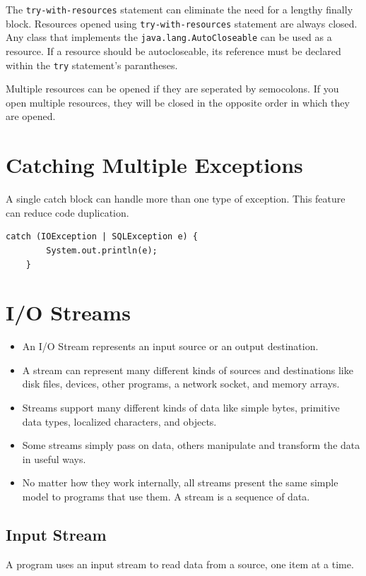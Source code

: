 \documentclass[11pt,a4paper]{article}
\begin{document}
The \texttt{try-with-resources} statement can eliminate the need for a lengthy finally block. Resources opened using \texttt{try-with-resources} statement are always closed. Any class that implements the \texttt{java.lang.AutoCloseable} can be used as a resource. If a resource should be autocloseable, its reference must be declared within the \texttt{try} statement's parantheses.

Multiple resources can be opened if they are seperated by semocolons. If you open multiple resources, they will be closed in the opposite order in which they are opened.

\section*{Catching Multiple Exceptions}
A single catch block can handle more than one type of exception. This feature can reduce code duplication.

\begin{lstlisting}[numbers=none]
    catch (IOException | SQLException e) {
        System.out.println(e);
    }
\end{lstlisting}
 
\section*{I/O Streams}
\begin{itemize}
\item An I/O Stream represents an input source or an output destination. 
\item A stream can represent many different kinds of sources and destinations like disk files, devices, other programs, a network socket, and memory arrays. 
\item Streams support many different kinds of data like simple bytes, primitive data types, localized characters, and objects. 
\item Some streams simply pass on data, others manipulate and transform the data in useful ways. 
\item No matter how they work internally, all streams present the same simple model to programs that use them. A stream is a sequence of data. 
\end{itemize}

\subsection*{Input Stream}
A program uses an input stream to read data from a source, one item at a time. 
\end{document}
